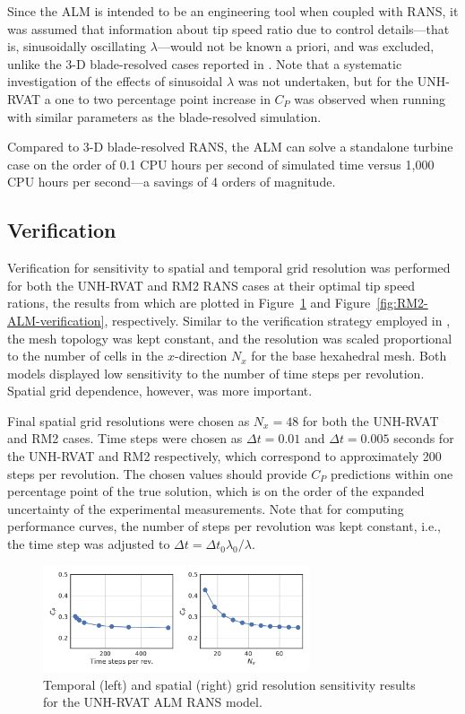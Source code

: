 \documentclass[times]{weauth}
\begin{document}
Since the ALM is intended to be an engineering tool when coupled with RANS, it
was assumed that information about tip speed ratio due to control details---that
is, sinusoidally oscillating $\lambda$---would not be known a priori, and was
excluded, unlike the 3-D blade-resolved cases reported in
\cite{Bachant2016-BR-CFD}. Note that a systematic investigation of the effects
of sinusoidal $\lambda$ was not undertaken, but for the UNH-RVAT a one to two
percentage point increase in $C_P$ was observed when running with similar
parameters as the blade-resolved simulation.

Compared to 3-D blade-resolved RANS, the ALM can solve a standalone turbine case
on the order of 0.1 CPU hours per second of simulated time versus 1,000 CPU
hours per second---a savings of 4 orders of magnitude.


\subsection{Verification}

Verification for sensitivity to spatial and temporal grid resolution was
performed for both the UNH-RVAT and RM2 RANS cases at their optimal tip speed
rations, the results from which are plotted in
Figure~\ref{fig:RVAT-ALM-verification} and
Figure~\ref{fig:RM2-ALM-verification}, respectively. Similar to the verification
strategy employed in \cite{Bachant2016-BR-CFD}, the mesh topology was kept
constant, and the resolution was scaled proportional to the number of cells in
the $x$-direction $N_x$ for the base hexahedral mesh. Both models displayed low
sensitivity to the number of time steps per revolution. Spatial grid dependence,
however, was more important.

Final spatial grid resolutions were chosen as $N_x=48$ for both the UNH-RVAT and
RM2 cases. Time steps were chosen as $\Delta t = 0.01$ and $\Delta t = 0.005$
seconds for the UNH-RVAT and RM2 respectively, which correspond to approximately
200 steps per revolution. The chosen values should provide $C_P$ predictions
within one percentage point of the true solution, which is on the order of the
expanded uncertainty of the experimental measurements. Note that for computing
performance curves, the number of steps per revolution was kept constant, i.e.,
the time step was adjusted to $\Delta t = \Delta t_0 \lambda_0 / \lambda$.

\begin{figure}
    \centering

    \includegraphics[width=0.7\textwidth]{RVAT-ALM_verification}

    \caption{Temporal (left) and spatial (right) grid resolution sensitivity
        results for the UNH-RVAT ALM RANS model.}

    \label{fig:RVAT-ALM-verification}
\end{figure}
\end{document}
